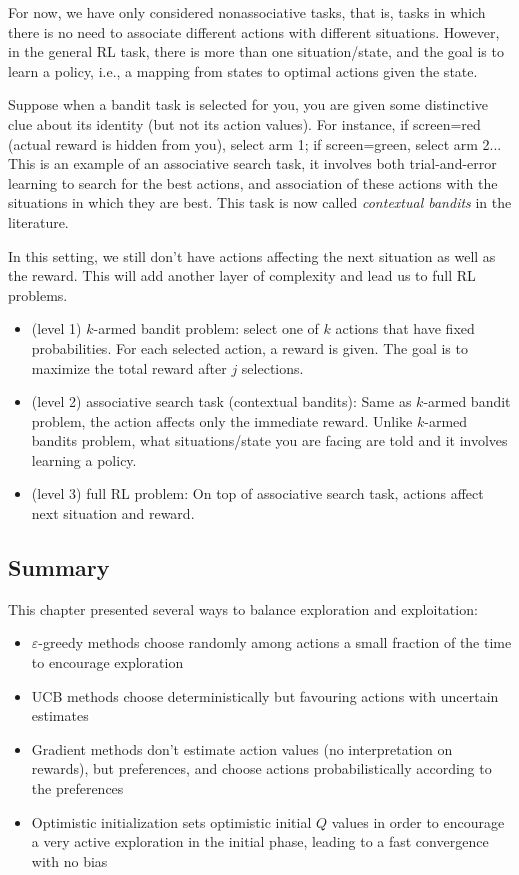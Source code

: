 \documentclass[sutton_barto_notes.tex]{subfiles}
\begin{document}
For now, we have only considered nonassociative tasks, that is, tasks in which there is no need to associate different actions with different situations.
However, in the general RL task, there is more than one situation/state, and the goal is to learn a policy, i.e., a mapping from states to optimal actions given the state.

Suppose when a bandit task is selected for you, you are given some distinctive clue about its identity (but not its action values). For instance, if screen=red (actual reward is hidden from you), select arm 1; if screen=green, select arm 2... This is an example of an associative search task, it involves both trial-and-error learning to search for the best actions, and association of these actions with the situations in which they are best. This task is now called \textit{contextual bandits} in the literature.

In this setting, we still don't have actions affecting the next situation as well as the reward. This will add another layer of complexity and lead us to full RL problems.

\begin{itemize}
\item (level 1) $k$-armed bandit problem: select one of $k$ actions that have fixed probabilities. For each selected action, a reward is given. The goal is to maximize the total reward after $j$ selections.
\item (level 2) associative search task (contextual bandits): Same as $k$-armed bandit problem, the action affects only the immediate reward. Unlike $k$-armed bandits problem, what situations/state you are facing are told and it involves learning a policy.
\item (level 3) full RL problem: On top of associative search task, actions affect next situation and reward.
\end{itemize}

\subsection{Summary}

This chapter presented several ways to balance exploration and exploitation:

\begin{itemize}
\item $\varepsilon$-greedy methods choose randomly among actions a small fraction of the time to encourage exploration
\item UCB methods choose deterministically but favouring actions with uncertain estimates
\item Gradient methods don't estimate action values (no interpretation on rewards), but preferences, and choose actions probabilistically according to the preferences
\item Optimistic initialization sets optimistic initial $Q$ values in order to encourage a very active exploration in the initial phase, leading to a fast convergence with no bias
\end{itemize}
\end{document}
